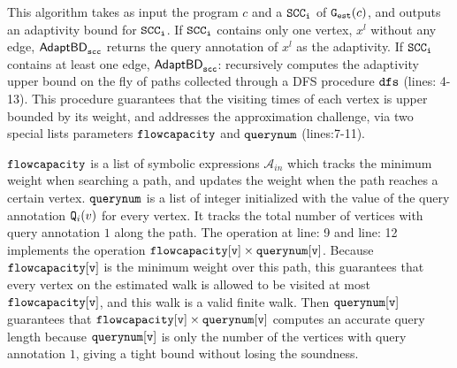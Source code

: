 This algorithm takes as input the program $c$ and a $\mathtt{SCC_i}$ of
$\mathtt{{G_{est}}}(c)$, and outputs an adaptivity bound for $\mathtt{SCC_i}$. 
If $\mathtt{SCC_i}$ contains only one vertex, $x^l$ without any edge, $\mathtt{\mathsf{AdaptBD}_{scc}}$ returns the query annotation of $x^l$ as the adaptivity.
If $\mathtt{SCC_i}$ contains at least one edge, 
$\mathtt{\mathsf{AdaptBD}_{scc}}$:
recursively computes the adaptivity upper bound on the fly of paths collected through a DFS procedure $\mathtt{dfs}$ (lines: 4-13). This procedure guarantees that the visiting times of each vertex is upper bounded by its weight, and addresses the approximation challenge,
via two special lists parameters $\mathtt{flowcapacity}$ and $\mathtt{querynum}$ (lines:7-11).
 
 
$\mathtt{flowcapacity}$ is a list of symbolic expressions $\mathcal{A}_{in}$ which tracks the minimum weight
when searching a path,
and updates the weight when the path reaches a certain vertex.
%
$\mathtt{querynum}$ is a list of integer
initialized with the value of the query annotation $\mathtt{Q}_i(v)$ for every vertex. 
It tracks the total number of vertices with query annotation $1$
along the path.
%
The operation
at line: 9 and line: 12 implements the operation  $\mathtt{flowcapacity[v] \times querynum[v]}$.
Because $\mathtt{flowcapacity[v]}$ is the minimum weight over this path,
this guarantees that every vertex on the estimated walk is allowed to be visited at most $\mathtt{flowcapacity[v]}$, and this walk is a valid finite walk.
Then $\mathtt{querynum[v]}$ guarantees that $\mathtt{flowcapacity[v] \times querynum[v]}$ computes an accurate query length
because $\mathtt{querynum[v]}$ is only the number of the vertices with query annotation $1$,
giving a tight bound without losing the soundness.


